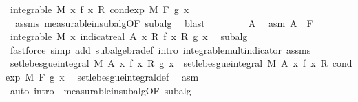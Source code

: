 \begin{isabellebody}
\ {\isachardoublequoteopen}integrable\ M\ {\isacharparenleft}{\kern0pt}{\isasymlambda}x{\isachardot}{\kern0pt}\ f\ x\ {\isacharasterisk}{\kern0pt}\isactrlsub R\ cond{\isacharunderscore}{\kern0pt}exp\ M\ F\ g\ x{\isacharparenright}{\kern0pt}{\isachardoublequoteclose}\ \isamarkupfalse%
\ {\isacharasterisk}{\kern0pt}\ assms\ measurable{\isacharunderscore}{\kern0pt}in{\isacharunderscore}{\kern0pt}subalg{\isacharbrackleft}{\kern0pt}OF\ subalg{\isacharbrackright}{\kern0pt}\ \isamarkupfalse%
\ blast\isanewline
\isanewline
\ \ \isacommand{{\isacharbraceleft}{\kern0pt}}\isamarkupfalse%
\isanewline
\ \ \ \ \isamarkupfalse%
\ A\ \isamarkupfalse%
\ asm{\isacharcolon}{\kern0pt}\ {\isachardoublequoteopen}A\ {\isasymin}\ F{\isachardoublequoteclose}\isanewline
\ \ \ \ \isamarkupfalse%
\ {\isachardoublequoteopen}integrable\ M\ {\isacharparenleft}{\kern0pt}{\isasymlambda}x{\isachardot}{\kern0pt}\ indicat{\isacharunderscore}{\kern0pt}real\ A\ x\ {\isacharasterisk}{\kern0pt}\isactrlsub R\ f\ x\ {\isacharasterisk}{\kern0pt}\isactrlsub R\ g\ x{\isacharparenright}{\kern0pt}{\isachardoublequoteclose}\ \isamarkupfalse%
\ subalg\ \isamarkupfalse%
\ {\isacharparenleft}{\kern0pt}fastforce\ simp\ add{\isacharcolon}{\kern0pt}\ subalgebra{\isacharunderscore}{\kern0pt}def\ intro{\isacharbang}{\kern0pt}{\isacharcolon}{\kern0pt}\ integrable{\isacharunderscore}{\kern0pt}mult{\isacharunderscore}{\kern0pt}indicator\ assms{\isacharparenleft}{\kern0pt}{}{\isacharparenright}{\kern0pt}{\isacharparenright}{\kern0pt}\isanewline
\ \ \ \ \isamarkupfalse%
\ {\isachardoublequoteopen}set{\isacharunderscore}{\kern0pt}lebesgue{\isacharunderscore}{\kern0pt}integral\ M\ A\ {\isacharparenleft}{\kern0pt}{\isasymlambda}x{\isachardot}{\kern0pt}\ f\ x\ {\isacharasterisk}{\kern0pt}\isactrlsub R\ g\ x{\isacharparenright}{\kern0pt}\ {\isacharequal}{\kern0pt}\ set{\isacharunderscore}{\kern0pt}lebesgue{\isacharunderscore}{\kern0pt}integral\ M\ A\ {\isacharparenleft}{\kern0pt}{\isasymlambda}x{\isachardot}{\kern0pt}\ f\ x\ {\isacharasterisk}{\kern0pt}\isactrlsub R\ cond{\isacharunderscore}{\kern0pt}exp\ M\ F\ g\ x{\isacharparenright}{\kern0pt}{\isachardoublequoteclose}\ \isamarkupfalse%
\ set{\isacharunderscore}{\kern0pt}lebesgue{\isacharunderscore}{\kern0pt}integral{\isacharunderscore}{\kern0pt}def\ \isamarkupfalse%
\ asm\ \isamarkupfalse%
\ {\isacharparenleft}{\kern0pt}auto\ intro{\isacharbang}{\kern0pt}{\isacharcolon}{\kern0pt}\ {\isacharasterisk}{\kern0pt}\ measurable{\isacharunderscore}{\kern0pt}in{\isacharunderscore}{\kern0pt}subalg{\isacharbrackleft}{\kern0pt}OF\ subalg{\isacharbrackright}{\kern0pt}{\isacharparenright}{\kern0pt}\isanewline

\end{isabellebody}

